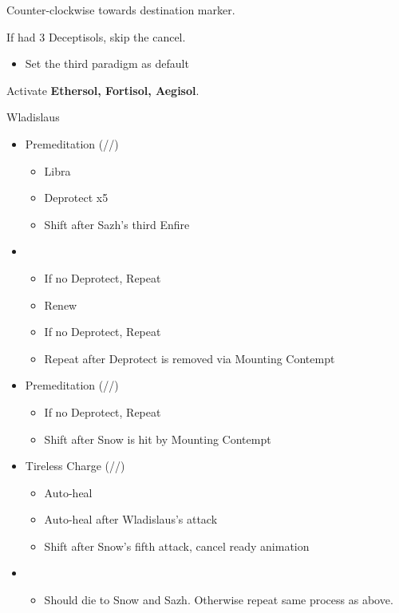 \begin{multicols}{2}
Counter-clockwise towards destination marker.

 If had 3 Deceptisols, skip the cancel.

\begin{menu}
\begin{itemize}
    \paradigm
    \begin{itemize}
        \item Set the third paradigm as default
    \end{itemize}
\end{itemize}
\end{menu}

Activate \textbf{Ethersol, Fortisol, Aegisol}.
\vfill

\renewcommand{\third}{[3] Premeditation (\sab/\sen/\syn)}
\renewcommand{\first}{[1] Tireless Charge (\med/\com/\com)}

\begin{battle}{Wladislaus}
\begin{itemize}
    \item \third
    \begin{itemize}
        \item Libra
        \item Deprotect x5
        \item Shift after Sazh's third Enfire
    \end{itemize}
    \item \second
    \begin{itemize}
        \item If no Deprotect, Repeat
        \item Renew
        \item If no Deprotect, Repeat
        \item Repeat after Deprotect is removed via Mounting Contempt
    \end{itemize}
    \item \third
    \begin{itemize}
        \item If no Deprotect, Repeat
        \item Shift after Snow is hit by Mounting Contempt
    \end{itemize}
    \item \first
    \begin{itemize}
        \item Auto-heal
        \item Auto-heal after Wladislaus's attack
        \item Shift after Snow's fifth attack, cancel ready animation
    \end{itemize}
    \item \second
    \begin{itemize}
        \item Should die to Snow and Sazh. Otherwise repeat same process as above.
    \end{itemize}
\end{itemize}
\end{battle}


\end{multicols}
